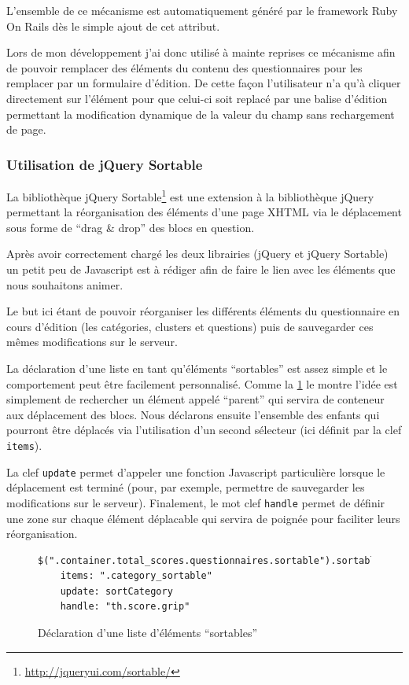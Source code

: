 \documentclass[12pt,a4paper]{book}
\begin{document}
L'ensemble de ce mécanisme est automatiquement généré par le framework Ruby On Rails dès le simple ajout de cet attribut.

Lors de mon développement j'ai donc utilisé à mainte reprises ce mécanisme afin de pouvoir remplacer des éléments du contenu des questionnaires pour les remplacer par un formulaire d'édition. De cette façon l'utilisateur n'a qu'à cliquer directement sur l'élément pour que celui-ci soit replacé par une balise d'édition permettant la modification dynamique de la valeur du champ sans rechargement de page.  

\subsubsection{Utilisation de jQuery Sortable}

La bibliothèque jQuery Sortable\footnote{\url{http://jqueryui.com/sortable/}} est une extension à la bibliothèque jQuery permettant la réorganisation des éléments d'une page XHTML via le déplacement sous forme de ``drag \& drop'' des blocs en question.

Après avoir correctement chargé les deux librairies (jQuery et jQuery Sortable) un petit peu de Javascript est à rédiger afin de faire le lien avec les éléments que nous souhaitons animer.

Le but ici étant de pouvoir réorganiser les différents éléments du questionnaire en cours d'édition (les catégories, clusters et questions) puis de sauvegarder ces mêmes modifications sur le serveur.

La déclaration d'une liste en tant qu'éléments ``sortables'' est assez simple et le comportement peut être facilement personnalisé. Comme la \cref{fig.sort1} le montre l'idée est simplement de rechercher un élément appelé ``parent'' qui servira de conteneur aux déplacement des blocs. Nous déclarons ensuite l'ensemble des enfants qui pourront être déplacés via l'utilisation d'un second sélecteur (ici définit par la clef \texttt{items}).

La clef \texttt{update} permet d'appeler une fonction Javascript particulière lorsque le déplacement est terminé (pour, par exemple, permettre de sauvegarder les modifications sur le serveur). Finalement, le mot clef \texttt{handle} permet de définir une zone sur chaque élément déplacable qui servira de poignée pour faciliter leurs réorganisation.

\begin{figure}[h]
\begin{lstlisting}
$(".container.total_scores.questionnaires.sortable").sortable
    items: ".category_sortable"
    update: sortCategory
    handle: "th.score.grip"
\end{lstlisting}
 \caption{Déclaration d'une liste d'éléments ``sortables''}
 \label{fig.sort1}
\end{figure}
\end{document}
